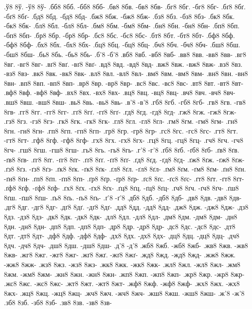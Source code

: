 {.ў8 8ў. -ў8 8ў-
.бб8 8бб. -бб8 8бб-
.бв8 8бв. -бв8 8бв-
.бг8 8бг. -бг8 8бг-
.бґ8 8бґ. -бґ8 8бґ-
.бд8 8бд. -бд8 8бд-
.бж8 8бж. -бж8 8бж-
.бз8 8бз. -бз8 8бз-
.бк8 8бк. -бк8 8бк-
.бл8 8бл. -бл8 8бл-
.бм8 8бм. -бм8 8бм-
.бн8 8бн. -бн8 8бн-
.бп8 8бп. -бп8 8бп-
.бр8 8бр. -бр8 8бр-
.бс8 8бс. -бс8 8бс-
.бт8 8бт. -бт8 8бт-
.бф8 8бф. -бф8 8бф-
.бх8 8бх. -бх8 8бх-
.бц8 8бц. -бц8 8бц-
.бч8 8бч. -бч8 8бч-
.бш8 8бш. -бш8 8бш-
.бь8 8бь. -бь8 8бь-
.б'8 -б'8
.вб8 8вб. -вб8 8вб-
.вв8 8вв. -вв8 8вв-
.вг8 8вг. -вг8 8вг-
.вґ8 8вґ. -вґ8 8вґ-
.вд8 8вд. -вд8 8вд-
.вж8 8вж. -вж8 8вж-
.вз8 8вз. -вз8 8вз-
.вк8 8вк. -вк8 8вк-
.вл8 8вл. -вл8 8вл-
.вм8 8вм. -вм8 8вм-
.вн8 8вн. -вн8 8вн-
.вп8 8вп. -вп8 8вп-
.вр8 8вр. -вр8 8вр-
.вс8 8вс. -вс8 8вс-
.вт8 8вт. -вт8 8вт-
.вф8 8вф. -вф8 8вф-
.вх8 8вх. -вх8 8вх-
.вц8 8вц. -вц8 8вц-
.вч8 8вч. -вч8 8вч-
.вш8 8вш. -вш8 8вш-
.вь8 8вь. -вь8 8вь-
.в'8 -в'8
.гб8 8гб. -гб8 8гб-
.гв8 8гв. -гв8 8гв-
.гг8 8гг. -гг8 8гг-
.гґ8 8гґ. -гґ8 8гґ-
.гд8 8гд. -гд8 8гд-
.гж8 8гж. -гж8 8гж-
.гз8 8гз. -гз8 8гз-
.гк8 8гк. -гк8 8гк-
.гл8 8гл. -гл8 8гл-
.гм8 8гм. -гм8 8гм-
.гн8 8гн. -гн8 8гн-
.гп8 8гп. -гп8 8гп-
.гр8 8гр. -гр8 8гр-
.гс8 8гс. -гс8 8гс-
.гт8 8гт. -гт8 8гт-
.гф8 8гф. -гф8 8гф-
.гх8 8гх. -гх8 8гх-
.гц8 8гц. -гц8 8гц-
.гч8 8гч. -гч8 8гч-
.гш8 8гш. -гш8 8гш-
.гь8 8гь. -гь8 8гь-
.г'8 -г'8
.ґб8 8ґб. -ґб8 8ґб-
.ґв8 8ґв. -ґв8 8ґв-
.ґг8 8ґг. -ґг8 8ґг-
.ґґ8 8ґґ. -ґґ8 8ґґ-
.ґд8 8ґд. -ґд8 8ґд-
.ґж8 8ґж. -ґж8 8ґж-
.ґз8 8ґз. -ґз8 8ґз-
.ґк8 8ґк. -ґк8 8ґк-
.ґл8 8ґл. -ґл8 8ґл-
.ґм8 8ґм. -ґм8 8ґм-
.ґн8 8ґн. -ґн8 8ґн-
.ґп8 8ґп. -ґп8 8ґп-
.ґр8 8ґр. -ґр8 8ґр-
.ґс8 8ґс. -ґс8 8ґс-
.ґт8 8ґт. -ґт8 8ґт-
.ґф8 8ґф. -ґф8 8ґф-
.ґх8 8ґх. -ґх8 8ґх-
.ґц8 8ґц. -ґц8 8ґц-
.ґч8 8ґч. -ґч8 8ґч-
.ґш8 8ґш. -ґш8 8ґш-
.ґь8 8ґь. -ґь8 8ґь-
.ґ'8 -ґ'8
.дб8 8дб. -дб8 8дб-
.дв8 8дв. -дв8 8дв-
.дг8 8дг. -дг8 8дг-
.дґ8 8дґ. -дґ8 8дґ-
.дд8 8дд. -дд8 8дд-
.дж8 8дж. -дж8 8дж-
.дз8 8дз. -дз8 8дз-
.дк8 8дк. -дк8 8дк-
.дл8 8дл. -дл8 8дл-
.дм8 8дм. -дм8 8дм-
.дн8 8дн. -дн8 8дн-
.дп8 8дп. -дп8 8дп-
.др8 8др. -др8 8др-
.дс8 8дс. -дс8 8дс-
.дт8 8дт. -дт8 8дт-
.дф8 8дф. -дф8 8дф-
.дх8 8дх. -дх8 8дх-
.дц8 8дц. -дц8 8дц-
.дч8 8дч. -дч8 8дч-
.дш8 8дш. -дш8 8дш-
.д'8 -д'8
.жб8 8жб. -жб8 8жб-
.жв8 8жв. -жв8 8жв-
.жг8 8жг. -жг8 8жг-
.жґ8 8жґ. -жґ8 8жґ-
.жд8 8жд. -жд8 8жд-
.жж8 8жж. -жж8 8жж-
.жз8 8жз. -жз8 8жз-
.жк8 8жк. -жк8 8жк-
.жл8 8жл. -жл8 8жл-
.жм8 8жм. -жм8 8жм-
.жн8 8жн. -жн8 8жн-
.жп8 8жп. -жп8 8жп-
.жр8 8жр. -жр8 8жр-
.жс8 8жс. -жс8 8жс-
.жт8 8жт. -жт8 8жт-
.жф8 8жф. -жф8 8жф-
.жх8 8жх. -жх8 8жх-
.жц8 8жц. -жц8 8жц-
.жч8 8жч. -жч8 8жч-
.жш8 8жш. -жш8 8жш-
.ж'8 -ж'8
.зб8 8зб. -зб8 8зб-
.зв8 8зв. -зв8 8зв-
}
